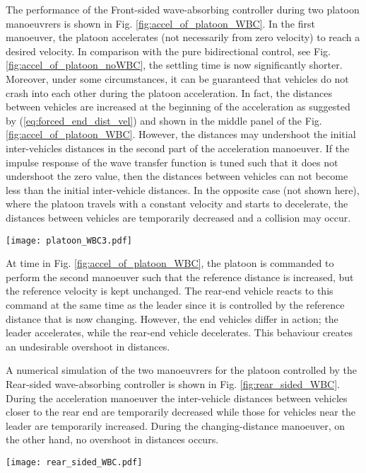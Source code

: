 \documentclass[final,5p,times,twocolumn]{elsarticle}
\begin{document}
The performance of the Front-sided wave-absorbing controller during two platoon manoeuvrers is shown in Fig. \ref{fig:accel_of_platoon_WBC}. In the first  manoeuver, the platoon accelerates (not necessarily from zero velocity) to reach a desired velocity. In comparison with the pure bidirectional control, see Fig. \ref{fig:accel_of_platoon_noWBC}, the settling time is now significantly shorter. Moreover, under some circumstances, it can be guaranteed that vehicles do not crash into each other during the platoon acceleration. In fact, the distances between vehicles are increased at the beginning of the acceleration as suggested by (\ref{eq:forced_end_dist_vel}) and shown in the middle panel of the Fig. \ref{fig:accel_of_platoon_WBC}. However, the distances may undershoot the initial inter-vehicles distances in the second part of the acceleration manoeuver. If the impulse response of the wave transfer function is tuned such that it does not undershoot the zero value, then the distances between vehicles can not become less than the initial inter-vehicle distances. In the opposite case (not shown here), where the platoon travels with a constant velocity and starts to decelerate, the distances between vehicles are temporarily decreased and a collision may occur.

\begin{figure*}[!htbp]
 \centering
  \texttt{[image: platoon\_WBC3.pdf]}
  \caption{Simulation of two platoon manoeuvrers with the Front-sided wave-absorbing controller. At the beginning, the vehicles are standing still separated by one meter. For the first manoeuver, the platoon is commanded to accelerate to  with  starting at time .  At time , the platoon is commanded to perform the second manoeuver such that the reference distance is increased to  without changing the reference velocity.}
  \label{fig:accel_of_platoon_WBC}
\end{figure*}

At time  in Fig. \ref{fig:accel_of_platoon_WBC}, the platoon is commanded to perform the second manoeuver such that the reference distance is increased, but the reference velocity is kept unchanged. The rear-end vehicle reacts to this command at the same time as the leader since it is controlled by the reference distance that is now changing. However, the end vehicles differ in action; the leader accelerates, while the rear-end vehicle decelerates. This behaviour creates an undesirable overshoot in distances.

A numerical simulation of the two manoeuvrers for the platoon controlled by the Rear-sided wave-absorbing controller is shown in Fig. \ref{fig:rear_sided_WBC}. During the acceleration manoeuver the inter-vehicle distances between vehicles closer to the rear end are temporarily decreased while those for vehicles near the leader are temporarily increased. During the changing-distance manoeuver, on the other hand, no overshoot in distances occurs.
\begin{figure*}[!htbp]
 \centering
  \texttt{[image: rear\_sided\_WBC.pdf]}
    \caption{As in Fig. \ref{fig:accel_of_platoon_WBC} but with the Rear-sided wave-absorbing controller.}
  \label{fig:rear_sided_WBC}
\end{figure*}
\end{document}

